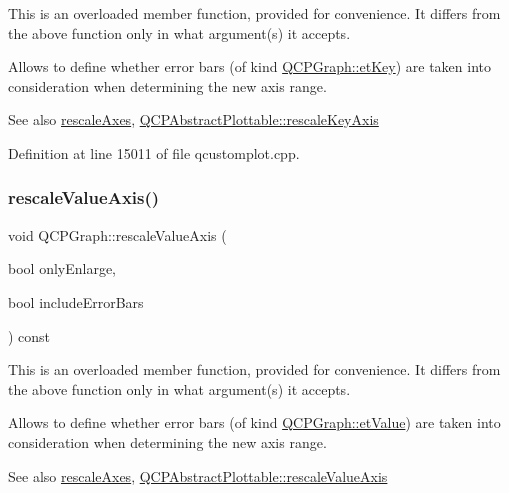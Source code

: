 This is an overloaded member function, provided for convenience. It differs from the above function only in what argument(s) it accepts.

Allows to define whether error bars (of kind \hyperlink{class_q_c_p_graph_ad23b514404bd2cb3216f57c90904d6afa2a5d89cd76fb8b6b18d71b8f6f6c0f43}{Q\+C\+P\+Graph\+::et\+Key}) are taken into consideration when determining the new axis range.

\begin{DoxySeeAlso}{See also}
\hyperlink{class_q_c_p_graph_a9c3909d6116e9d03978f057d41174e6a}{rescale\+Axes}, \hyperlink{class_q_c_p_abstract_plottable_ae96b83c961e257da116c6acf9c7da308}{Q\+C\+P\+Abstract\+Plottable\+::rescale\+Key\+Axis} 
\end{DoxySeeAlso}


Definition at line 15011 of file qcustomplot.\+cpp.

\mbox{\label{class_q_c_p_graph_a9e0e620a56932c4df80a3762c2f93608}} 
\subsubsection{\texorpdfstring{rescale\+Value\+Axis()}{rescaleValueAxis()}}
{\footnotesize\ttfamily void Q\+C\+P\+Graph\+::rescale\+Value\+Axis (\begin{DoxyParamCaption}\item[{bool}]{only\+Enlarge,  }\item[{bool}]{include\+Error\+Bars }\end{DoxyParamCaption}) const}

This is an overloaded member function, provided for convenience. It differs from the above function only in what argument(s) it accepts.

Allows to define whether error bars (of kind \hyperlink{class_q_c_p_graph_ad23b514404bd2cb3216f57c90904d6afa147022ccdc49f6bd48f904cb4f61872e}{Q\+C\+P\+Graph\+::et\+Value}) are taken into consideration when determining the new axis range.

\begin{DoxySeeAlso}{See also}
\hyperlink{class_q_c_p_graph_a9c3909d6116e9d03978f057d41174e6a}{rescale\+Axes}, \hyperlink{class_q_c_p_abstract_plottable_aa1e408bb2d13999150c3f7f8a8579ca9}{Q\+C\+P\+Abstract\+Plottable\+::rescale\+Value\+Axis} 
\end{DoxySeeAlso}


